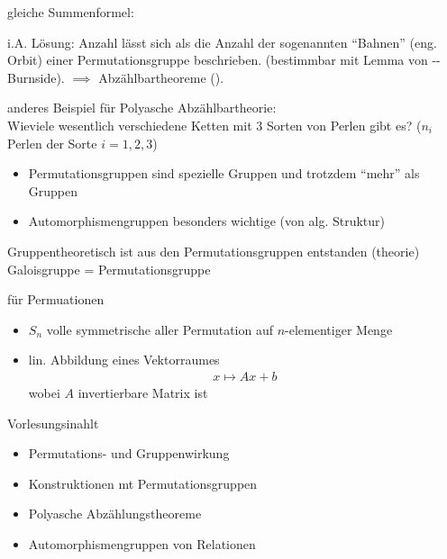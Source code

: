 \begin{remark}
	gleiche Summenformel:
\end{remark}
i.A. Lösung: Anzahl lässt sich als die Anzahl der sogenannten ``Bahnen'' (eng. Orbit) einer Permutationsgruppe beschrieben. (bestimmbar mit Lemma von --Burnside). $\implies$ Abzählbartheoreme ().
\begin{example}
	anderes Beispiel für Polyasche Abzählbartheorie:\\
	Wieviele wesentlich verschiedene Ketten mit 3 Sorten von Perlen gibt es? ($n_i$ Perlen der Sorte $i = 1,2,3$)
\end{example}
\begin{itemize}
	\item Permutationsgruppen sind spezielle Gruppen und trotzdem ``mehr'' als Gruppen
	\item Automorphismengruppen besonders wichtige (von alg. Struktur)
\end{itemize}
Gruppentheoretisch ist aus den Permutationsgruppen entstanden (theorie) Galoisgruppe = Permutationsgruppe
\begin{example}
	für Permuationen
	\begin{itemize}
		\item $S_n$ volle symmetrische aller Permutation auf $n$-elementiger Menge
		\item lin. Abbildung eines Vektorraumes
		\begin{align*}
			x \mapsto Ax + b
		\end{align*}
		wobei $A$ invertierbare Matrix ist
	\end{itemize}
\end{example}
Vorlesungsinahlt
\begin{itemize} 
	\item Permutations- und Gruppenwirkung
	\item Konstruktionen mt Permutationsgruppen
	\item Polyasche Abzählungstheoreme
	\item Automorphismengruppen von Relationen
\end{itemize}